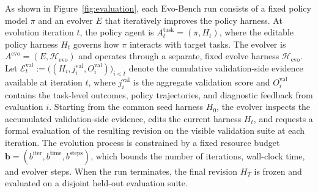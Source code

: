 As shown in Figure~\ref{fig:evaluation}, each Evo-Bench run consists of a fixed policy model $\pi$ and an evolver $E$ that iteratively improves the policy harness.
At evolution iteration $t$, the policy agent is $A_t^{\mathrm{task}}=(\pi,H_t)$, where the editable policy harness $H_t$ governs how $\pi$ interacts with target tasks.
The evolver is $A^{\mathrm{evo}}=(E,\mathcal{H}_{\mathrm{evo}})$ and operates through a separate, fixed evolve harness $\mathcal{H}_{\mathrm{evo}}$. 
Let $\mathcal{E}_t^{\mathrm{val}}:=\bigl((H_i,j_i^{\mathrm{val}},O_i^{\mathrm{val}})\bigr)_{i<t}$ denote the cumulative validation-side evidence available at iteration $t$, where $j_i^{\mathrm{val}}$ is the aggregate validation score and $O_i^{\mathrm{val}}$ contains the task-level outcomes, policy trajectories, and diagnostic feedback from evaluation $i$.
Starting from the common seed harness $H_0$, the evolver inspects the accumulated validation-side evidence, edits the current harness $H_t$, and requests a formal evaluation of the resulting revision on the visible validation suite at each iteration. 
The evolution process is constrained by a fixed resource budget $\mathbf{b}=(b^{\mathrm{iter}},b^{\mathrm{time}},b^{\mathrm{steps}})$, which bounds the number of iterations, wall-clock time, and evolver steps. When the run terminates, the final revision $H_T$ is frozen and evaluated on a disjoint held-out evaluation suite.





